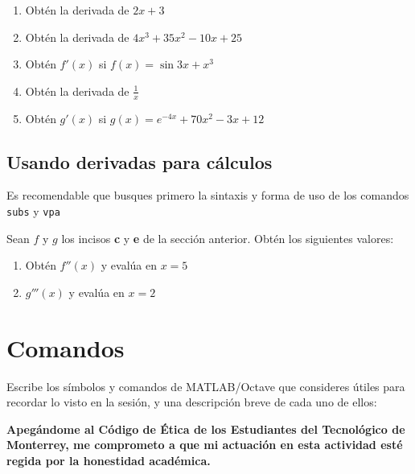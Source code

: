 \documentclass[spanish, 10pt]{article}
\newcommand{\matlab}[1]{\lstinline[style=Matlab-pyglike]!#1!}
\begin{document}
\begin{enumerate}[label=\alph*)]
    \item Obtén la derivada de $2x + 3$
    \item Obtén la derivada de $4x^3 + 35x^2 - 10x + 25$
    \item Obtén $f'(x)$ si $f(x) = \sin 3x + x^3$
    \item Obtén la derivada de $\frac{1}{x}$
    \item Obtén $g'(x)$ si $g(x) = e^{-4x} + 70x^2 - 3x + 12$
\end{enumerate}

\subsection{Usando derivadas para cálculos}

Es recomendable que busques primero la sintaxis y forma de uso de los comandos \matlab{subs} y \matlab{vpa}

Sean $f$ y $g$ los incisos \textbf{c} y \textbf{e} de la sección anterior. Obtén los siguientes valores:

\begin{enumerate}
    \item Obtén $f''(x)$ y evalúa en $x=5$
    \item $g'''(x)$ y evalúa en $x=2$
\end{enumerate}

\section{Comandos}

Escribe los símbolos y comandos de MATLAB/Octave que consideres útiles para recordar lo visto en la sesión, y una descripción breve de cada uno de ellos:

\vfill

\textbf{Apegándome al Código de Ética de los Estudiantes del Tecnológico de Monterrey, me comprometo a que mi actuación en esta actividad esté regida por la honestidad académica.}
\end{document}
